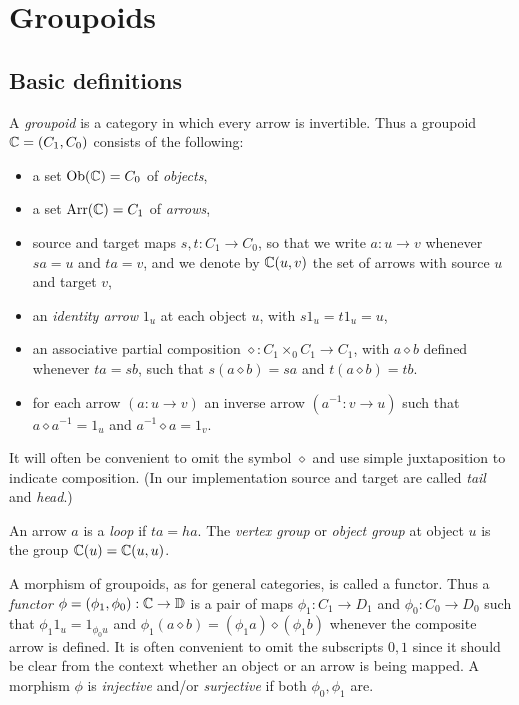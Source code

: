 
\section{Groupoids} \label{sec:gpds}


\subsection{Basic definitions} \label{subsect:gpd-defs}
  

A \emph{groupoid} is a category in which every arrow is invertible. 
Thus a groupoid $\mathbb{C} = (C_1,C_0)$ consists of the following: 
\begin{itemize}
\item
a set $\mathrm{Ob}(\mathbb{C}) = C_0$ of \emph{objects}, 
\item 
a set $\mathrm{Arr}(\mathbb{C}) = C_1$ of \emph{arrows}, 
\item
source and target maps $s,t : C_1 \to C_0$, so that we write 
$a:u \to v$ whenever $sa=u$ and $ta=v$, 
and we denote by $\mathbb{C}(u,v)$ the set of arrows with source $u$ and target $v$, 
\item 
an \emph{identity arrow} $1_u$ at each object $u$, with $s1_u=t1_u=u$, 
\item 
an associative  partial composition $\diamond: C_1 \times_0 C_1 \to C_1$, 
with $a \diamond b$ defined whenever $ta=sb$, such that 
$s(a \diamond b) = sa$ and $t(a \diamond b) = tb$. 
\item 
for each arrow $(a : u \to v)$ an inverse arrow $(a^{-1} : v \to u)$ 
such that $a \diamond a^{-1} = 1_u$ and $a^{-1} \diamond a = 1_v$. 
\end{itemize}
It will often be convenient to omit the symbol $\diamond$ and use simple 
juxtaposition to indicate composition. 
(In our {\GAP} implementation source and target are called 
\emph{tail} and \emph{head}.) 

An arrow $a$ is a \emph{loop} if $ta = ha$. 
The \emph{vertex group} or \emph{object group} at object $u$ is the group 
$\mathbb{C}(u) = \mathbb{C}(u,u)$. 

A morphism of groupoids, as for general categories, is called a functor. 
  
Thus a \emph{functor} $\phi = (\phi_1,\phi_0) : \mathbb{C} \to \mathbb{D}$
is a pair of maps $\phi_1 : C_1 \to D_1$ and $\phi_0 : C_0 \to D_0$ 
such that $\phi_1 1_u = 1_{\phi_0 u}$ and 
$\phi_1(a \diamond b) = (\phi_1a)\diamond(\phi_1b)$ 
whenever the composite arrow is defined. 
It is often convenient to omit the subscripts $0,1$ since it should be clear 
from the context whether an object or an arrow is being mapped. 
A morphism $\phi$ is \emph{injective} and/or \emph{surjective} 
if both $\phi_0,\phi_1$ are. 

